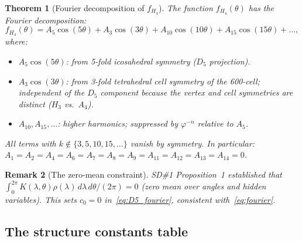 \documentclass[11pt,letterpaper]{article}
\newtheorem{theorem}{Theorem}[section]
\newtheorem{remark}[theorem]{Remark}
\newcommand{\phig}{\varphi}
\begin{document}
\begin{theorem}[Fourier decomposition of $f_{H_4}$]
\label{thm:fourier}
The function $f_{H_4}(\theta)$ has the Fourier decomposition:
\begin{equation}
f_{H_4}(\theta)
= A_5\cos(5\theta) + A_3\cos(3\theta) + A_{10}\cos(10\theta)
+ A_{15}\cos(15\theta) + \ldots,
\label{eq:fourier}
\end{equation}
where:
\begin{itemize}
\item $A_5\cos(5\theta)$: from 5-fold icosahedral symmetry ($D_5$
  projection).
\item $A_3\cos(3\theta)$: from 3-fold tetrahedral cell symmetry of
  the 600-cell; independent of the $D_5$ component because the vertex
  and cell symmetries are distinct ($H_3$ vs.\ $A_4$).
\item $A_{10}, A_{15}, \ldots$: higher harmonics; suppressed by
  $\phig^{-n}$ relative to $A_5$.
\end{itemize}
All terms with $k \not\in \{3, 5, 10, 15, \ldots\}$ vanish by
symmetry.  In particular: $A_1 = A_2 = A_4 = A_6 = A_7 = A_8 =
A_9 = A_{11} = A_{12} = A_{13} = A_{14} = 0$.
\end{theorem}

\begin{remark}[The zero-mean constraint]
SD\#1 Proposition~1 established that $\int_0^{2\pi} K(\lambda,\theta)
\rho(\lambda)\,d\lambda\,d\theta/(2\pi) = 0$ (zero mean over angles
and hidden variables).  This sets $c_0 = 0$ in~\eqref{eq:D5_fourier},
consistent with~\eqref{eq:fourier}.
\end{remark}

\subsection{The structure constants table}
\end{document}
